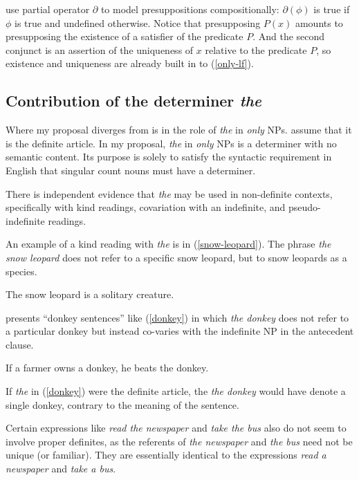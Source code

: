 \citeauthor{cb2015} use  partial operator $\partial$ to model presuppositions compositionally: $\partial(\phi)$ is true if $\phi$ is true and undefined otherwise. Notice that presupposing $P(x)$ amounts to presupposing the existence of a satisfier of the predicate $P$. And the second conjunct is an assertion of the uniqueness of $x$ relative to the predicate $P$, so existence and uniqueness are already built in to (\ref{only-lf}).

\subsection{Contribution of the determiner \textit{the}}
Where my proposal diverges from  is in the role of \textit{the} in \textit{only} NPs. \citeauthor{cb2015} assume that it is the definite article. In my proposal, \textit{the} in \textit{only} NPs is a determiner with no semantic content. Its purpose is solely to satisfy the syntactic requirement in English that singular count nouns must have a determiner.

There is independent evidence that \textit{the} may be used in non-definite contexts, specifically with kind readings, covariation with an indefinite, and pseudo-indefinite readings.

An example of a kind reading with \textit{the} is in (\ref{snow-leopard}). The phrase \textit{the snow leopard} does not refer to a specific snow leopard, but to snow leopards as a species.

\begin{exe}
	\ex \label{snow-leopard} The snow leopard is a solitary creature.
\end{exe}

\citet{schwarz09} presents ``donkey sentences'' like (\ref{donkey}) in which \textit{the donkey} does not refer to a particular donkey but instead co-varies with the indefinite NP in the antecedent clause.

\begin{exe}
	\ex \label{donkey} If a farmer owns a donkey, he beats the donkey.
\end{exe}

If \textit{the} in (\ref{donkey}) were the definite article, the \textit{the donkey} would have denote a single donkey, contrary to the meaning of the sentence.

Certain expressions like \textit{read the newspaper} and \textit{take the bus} also do not seem to involve proper definites, as the referents of \textit{the newspaper} and \textit{the bus} need not be unique (or familiar). They are essentially identical to the expressions \textit{read a newspaper} and \textit{take a bus}.

